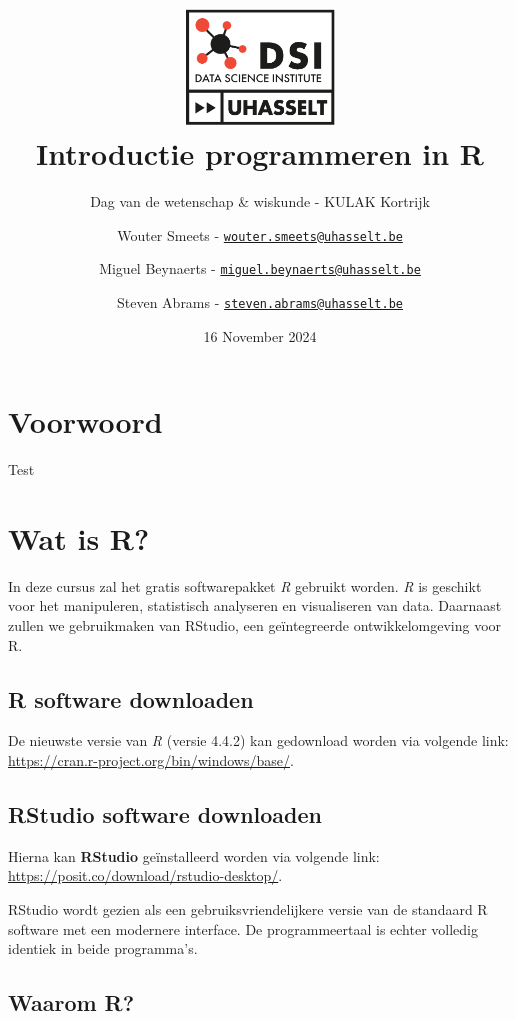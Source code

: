 \documentclass[
]{book}
\title{\includegraphics[width=4cm,height=\textheight]{dsi.png}\\
Introductie programmeren in R}
\subtitle{Dag van de wetenschap \& wiskunde - KULAK Kortrijk}
\author{Wouter Smeets - \href{mailto:wouter.smeets@uhasselt.be}{\nolinkurl{wouter.smeets@uhasselt.be}} \and Miguel Beynaerts - \href{mailto:miguel.beynaerts@uhasselt.be}{\nolinkurl{miguel.beynaerts@uhasselt.be}} \and Steven Abrams - \href{mailto:steven.abrams@uhasselt.be}{\nolinkurl{steven.abrams@uhasselt.be}}}
\date{16 November 2024}
\begin{document}
\maketitle

{
\setcounter{tocdepth}{1}
\tableofcontents
}
\hypertarget{voorwoord}{%
\chapter*{Voorwoord}\label{voorwoord}}

Test

\hypertarget{wat-is-r}{%
\chapter{Wat is R?}\label{wat-is-r}}

In deze cursus zal het gratis softwarepakket \emph{R} gebruikt worden. \emph{R} is geschikt voor het manipuleren, statistisch analyseren en visualiseren van data. Daarnaast zullen we gebruikmaken van RStudio, een geïntegreerde ontwikkelomgeving voor R.

\hypertarget{r-software-downloaden}{%
\section{R software downloaden}\label{r-software-downloaden}}

De nieuwste versie van \emph{R} (versie 4.4.2) kan gedownload worden via volgende link:
\url{https://cran.r-project.org/bin/windows/base/}.

\hypertarget{rstudio-software-downloaden}{%
\section{RStudio software downloaden}\label{rstudio-software-downloaden}}

Hierna kan \textbf{RStudio} geïnstalleerd worden via volgende link:
\url{https://posit.co/download/rstudio-desktop/}.

RStudio wordt gezien als een gebruiksvriendelijkere versie van de standaard R
software met een modernere interface. De programmeertaal is echter volledig identiek in
beide programma's.

\hypertarget{waarom-r}{%
\section{Waarom R?}\label{waarom-r}}
\end{document}
